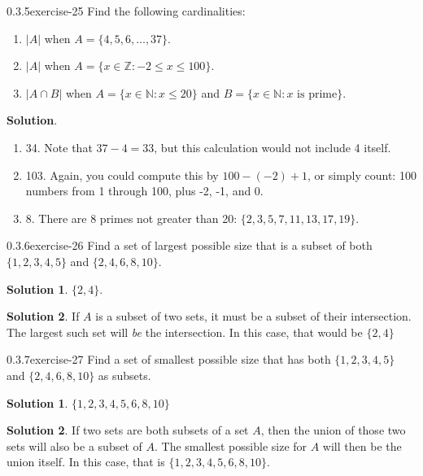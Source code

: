 \documentclass[twoside,11pt,]{book}
\numberwithin{equation}{chapter}
\newcommand{\N}{\mathbb N}
\newcommand{\Z}{\mathbb Z}
\newcommand{\st}{:}
\begin{document}
\begin{divisionsolution}{0.3.5}{}{exercise-25}%
\hypertarget{p-632}{}%
Find the following cardinalities:\leavevmode%
\begin{enumerate}[label=(\alph*)]
\item\hypertarget{li-614}{}\hypertarget{p-633}{}%
\(|A|\) when \(A = \{4,5,6,\ldots,37\}\text{.}\)%
\item\hypertarget{li-615}{}\hypertarget{p-635}{}%
\(|A|\) when \(A = \{x \in \Z \st -2 \le x \le 100\}\text{.}\)%
\item\hypertarget{li-616}{}\hypertarget{p-637}{}%
\(|A \cap B|\) when \(A = \{x \in \N \st x \le 20\}\) and \(B = \{x \in \N \st x \mbox{ is prime} \}\text{.}\)%
\end{enumerate}
%
\par\smallskip%
\noindent\textbf{Solution}.\quad%
\hypertarget{p-639}{}%
\leavevmode%
\begin{enumerate}[label=(\alph*)]
\item\hypertarget{li-617}{}\hypertarget{p-640}{}%
34. Note that \(37-4 = 33\text{,}\) but this calculation would not include 4 itself.%
\item\hypertarget{li-618}{}\hypertarget{p-641}{}%
103. Again, you could compute this by \(100-(-2)+1\text{,}\) or simply count: 100 numbers from 1 through 100, plus -2, -1, and 0.%
\item\hypertarget{li-619}{}\hypertarget{p-642}{}%
8. There are 8 primes not greater than 20: \(\{2, 3, 5, 7, 11, 13, 17, 19\}\text{.}\)%
\end{enumerate}
%
\end{divisionsolution}%
\begin{divisionsolution}{0.3.6}{}{exercise-26}%
\hypertarget{p-647}{}%
Find a set of largest possible size that is a subset of both \(\{1, 2, 3, 4, 5\}\) and \(\{2, 4, 6, 8,10\}\text{.}\)%
\par\smallskip%
\noindent\textbf{Solution 1}.\quad%
\hypertarget{p-649}{}%
\(\{2,4\}\text{.}\)%
\par\smallskip%
\noindent\textbf{Solution 2}.\quad%
\hypertarget{p-650}{}%
If \(A\) is a subset of two sets, it must be a subset of their intersection. The largest such set will \emph{be} the intersection. In this case, that would be \(\{2,4\}\)%
\end{divisionsolution}%
\begin{divisionsolution}{0.3.7}{}{exercise-27}%
\hypertarget{p-655}{}%
Find a set of smallest possible size that has both \(\{1,2,3,4,5\}\) and \(\{2,4,6,8,10\}\) as subsets.%
\par\smallskip%
\noindent\textbf{Solution 1}.\quad%
\hypertarget{p-657}{}%
\(\{1,2,3,4,5,6,8,10\}\)%
\par\smallskip%
\noindent\textbf{Solution 2}.\quad%
\hypertarget{p-658}{}%
If two sets are both subsets of a set \(A\text{,}\) then the union of those two sets will also be a subset of \(A\text{.}\) The smallest possible size for \(A\) will then be the union itself. In this case, that is \(\{1,2,3,4,5,6,8,10\}\text{.}\)%
\end{divisionsolution}%
\end{document}
